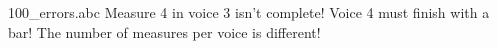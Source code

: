 100_errors.abc
Measure 4 in voice 3 isn't complete!
Voice 4 must finish with a bar!
The number of measures per voice is different!
